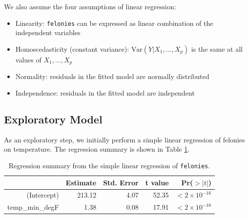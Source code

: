 \documentclass[11pt,notitlepage]{article}
\newenvironment{codeSmall}%
   {\par\noindent\adjustbox{margin=1ex,bgcolor=shadecolor,margin=0ex \medskipamount}\bgroup\minipage\linewidth\verbatim\footnotesize}%
   {\endverbatim\endminipage\egroup}
\begin{document}
We also assume the four assumptions of linear regression:
\begin{itemize}
\setlength\itemsep{-3pt}
\vspace*{-3mm}

\item Linearity: \texttt{felonies} can be expressed as linear combination of the independent variables
\item Homoscedasticity (constant variance): $\text{Var}(Y|X_1,\ldots, X_p)$ is the same at all values of $X_1,\ldots, X_p$
\item Normality: residuals in the fitted model are normally distributed
\item Independence: residuals in the fitted model are independent
\end{itemize}


\subsection{Exploratory Model}
\label{sec:feloniesExploratoryModel}

As an exploratory step, we initially perform a simple linear regression of felonies on temperature. The regression summary is shown in Table \ref{tab:lm1}.



\begin{table}[ht]
\vspace*{-1mm}
\footnotesize
\centering
\begin{tabular}{rrrrr}
  \hline
 & Estimate & Std. Error & t value & Pr($>|t|$) \\ 
  \hline
(Intercept) & 213.12 & 4.07 & 52.35 & $<2 \times 10^{-16}$ \\ 
  temp\_min\_degF & 1.38 & 0.08 & 17.91 & $<2 \times 10^{-16}$ \\ 
   \hline
\end{tabular}
\captionsetup{width=0.9\textwidth}
\vspace*{-2mm}
\caption{Regression summary from the simple linear regression of \texttt{felonies}.}
\label{tab:lm1}   
\vspace*{-3mm}
\end{table}
\end{document}
